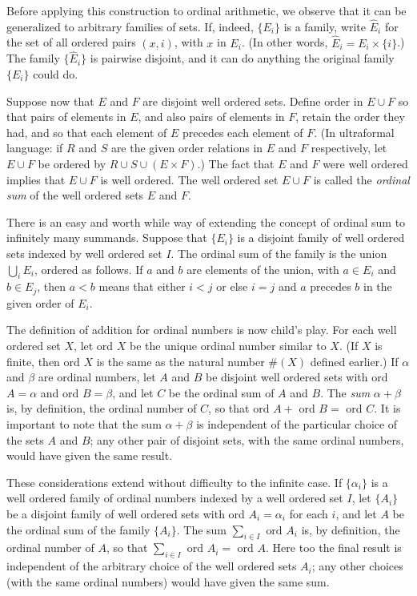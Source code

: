 Before applying this construction to ordinal arithmetic, we observe that it can be generalized to arbitrary families of sets. If, indeed, $\{ E_{i} \}$ is a family, write $\hat{E}_{i}$ for the set of all ordered pairs $(x,i)$, with $x$ in $E_{i}$. (In other words, $\hat{E}_{i} = E_{i} \times \{ i \}$.) The family $\{ \hat{E}_{i} \}$ is pairwise disjoint, and it can do anything the original family $\{ E_{i} \}$ could do. 

Suppose now that $E$ and $F$ are disjoint well ordered sets. Define order in $E \cup F$ so that pairs of elements in $E$, and also pairs of elements in $F$, retain the order they had, and so that each element of $E$ precedes each element of $F$. (In ultraformal language: if $R$ and $S$ are the given order relations in $E$ and $F$ respectively, let $E \cup F$ be ordered by $R \cup S \cup (E \times F)$.) The fact that $E$ and $F$ were well ordered implies that $E \cup F$ is well ordered. The well ordered set $E \cup F$ is called the \textit{ordinal sum} of the well ordered sets $E$ and $F$. 

There is an easy and worth while way of extending the concept of ordinal sum to infinitely many summands. Suppose that $\{ E_{i} \}$ is a disjoint family of well ordered sets indexed by well ordered set $I$. The ordinal sum of the family is the union $\bigcup_{i}E_{i}$, ordered as follows. If $a$ and $b$ are elements of the union, with $a \in E_{i}$ and $b \in E_{j}$, then $a < b$ means that either $i < j$ or else $i =j$ and $a$ precedes $b$ in the given order of $E_{i}$. 

The definition of addition for ordinal numbers is now child's play. For each well ordered set $X$, let ord $X$ be the unique ordinal number similar to $X$. (If $X$ is finite, then ord $X$ is the same as the natural number $\# (X)$ defined earlier.) If $\alpha$ and $\beta$ are ordinal numbers, let $A$ and $B$ be disjoint well ordered sets with ord $A = \alpha$ and ord $B =  \beta$, and let $C$ be the ordinal sum of $A$ and $B$. The \textit{sum} $ \alpha + \beta$ is, by definition, the ordinal number of $C$, so that ord $A +$ ord $B = $ ord $C$. It is important to note that the sum $\alpha + \beta$ is independent of the particular choice of the sets $A$ and $B$; any other pair of disjoint sets, with the same ordinal numbers, would have given the same result. 

These considerations extend without difficulty to the infinite case. If $\{ \alpha_{i} \}$ is a well ordered family of ordinal numbers indexed by a well ordered set $I$, let $\{ A_{i} \}$ be a disjoint family of well ordered sets with ord $A_{i} = \alpha_{i}$ for each $i$, and let $A$ be the ordinal sum of the family $\{ A_{i} \}$. The sum $\sum_{i \in I} \text{ ord } A_{i}$ is, by definition, the ordinal number of $A$, so that $\sum_{i \in I} \text{ ord } A_{i} = \text{ ord } A$. Here too the final result is independent of the arbitrary choice of the well ordered sets $A_{i}$; any other choices (with the same ordinal numbers) would have given the same sum. 

